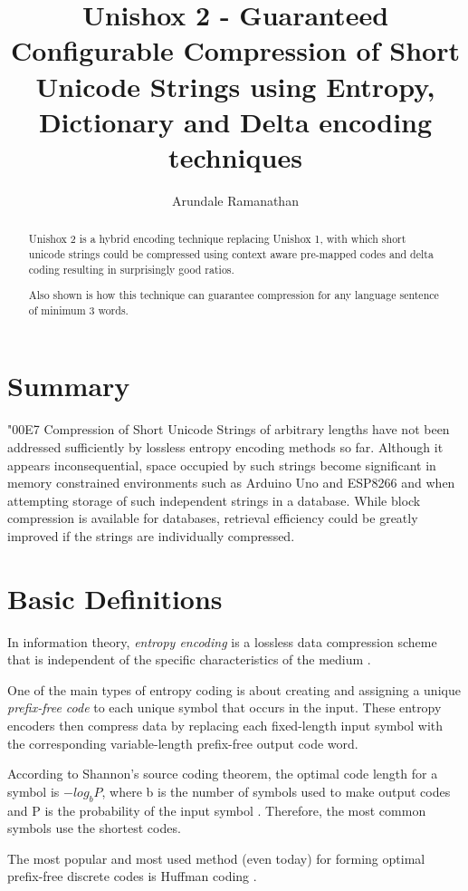 \documentclass[]{article}
\title{Unishox 2 - Guaranteed Configurable Compression of Short Unicode Strings using Entropy, Dictionary and Delta encoding techniques}
\author{Arundale Ramanathan}
\begin{document}
\maketitle

\begin{abstract}
Unishox 2 is a hybrid encoding technique replacing Unishox 1, with which short unicode strings could be compressed using context aware pre-mapped codes and delta coding resulting in surprisingly good ratios.

Also shown is how this technique can guarantee compression for any language sentence of minimum 3 words.
\end{abstract}

\section{Summary}

\char"00E7 Compression of Short Unicode Strings of arbitrary lengths have not been addressed sufficiently by lossless entropy encoding methods so far.  Although it appears inconsequential, space occupied by such strings become significant in memory constrained environments such as Arduino Uno and ESP8266 and when attempting storage of such independent strings in a database. While block compression is available for databases, retrieval efficiency could be greatly improved if the strings are individually compressed.

\section{Basic Definitions}

In information theory, \emph{entropy encoding} is a lossless data compression scheme that is independent of the specific characteristics of the medium \cite{1}.

One of the main types of entropy coding is about creating and assigning a unique \emph{prefix-free code} to each unique symbol that occurs in the input. These entropy encoders then compress data by replacing each fixed-length input symbol with the corresponding variable-length prefix-free output code word.

According to Shannon's source coding theorem, the optimal code length for a symbol is $-log_bP$, where b is the number of symbols used to make output codes and P is the probability of the input symbol \cite{2}. Therefore, the most common symbols use the shortest codes.

The most popular and most used method (even today) for forming optimal prefix-free discrete codes is Huffman coding \cite{3}.
\end{document}
